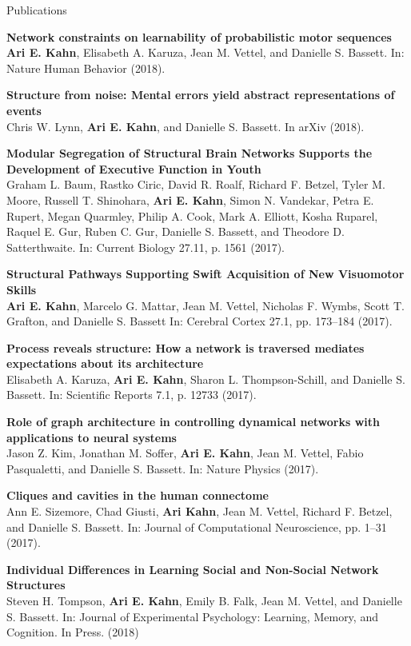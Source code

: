 \documentclass{resume} %
\begin{document}
\begin{rSection}{Publications}


\textbf{Network constraints on learnability of probabilistic motor sequences} \\
\textbf{Ari E. Kahn}, Elisabeth A. Karuza, Jean M. Vettel, and Danielle S. Bassett. In: Nature Human Behavior (2018).

\textbf{Structure from noise: Mental errors yield abstract representations of events} \\
Chris W. Lynn, \textbf{Ari E. Kahn}, and Danielle S. Bassett. In arXiv (2018).


\textbf{Modular Segregation of Structural Brain Networks Supports the Development of Executive Function in Youth} \\
Graham L. Baum, Rastko Ciric, David R. Roalf, Richard F. Betzel, Tyler M. Moore, Russell T. Shinohara, \textbf{Ari E. Kahn}, Simon N. Vandekar, Petra E. Rupert, Megan Quarmley, Philip A. Cook, Mark A. Elliott, Kosha Ruparel, Raquel E. Gur, Ruben C. Gur, Danielle S. Bassett, and Theodore D. Satterthwaite. In: Current Biology 27.11, p. 1561 (2017).

\textbf{Structural Pathways Supporting Swift Acquisition of New Visuomotor Skills} \\
\textbf{Ari E. Kahn}, Marcelo G. Mattar, Jean M. Vettel, Nicholas F. Wymbs, Scott T. Grafton, and Danielle S. Bassett In: Cerebral Cortex 27.1, pp. 173–184 (2017).

\textbf{Process reveals structure: How a network is traversed mediates expectations about its architecture} \\
Elisabeth A. Karuza, \textbf{Ari E. Kahn}, Sharon L. Thompson-Schill, and Danielle S. Bassett. In: Scientific Reports 7.1, p. 12733 (2017).

\textbf{Role of graph architecture in controlling dynamical networks with applications to neural systems} \\
Jason Z. Kim, Jonathan M. Soffer, \textbf{Ari E. Kahn}, Jean M. Vettel, Fabio Pasqualetti, and Danielle S. Bassett. In: Nature Physics (2017).

\textbf{Cliques and cavities in the human connectome} \\
Ann E. Sizemore, Chad Giusti, \textbf{Ari Kahn}, Jean M. Vettel, Richard F. Betzel, and Danielle S. Bassett. In: Journal of Computational Neuroscience, pp. 1–31 (2017).

\textbf{Individual Differences in Learning Social and Non-Social Network Structures} \\
Steven H. Tompson, \textbf{Ari E. Kahn}, Emily B. Falk, Jean M. Vettel, and Danielle S. Bassett. In: Journal of Experimental Psychology: Learning, Memory, and Cognition. In Press. (2018)


\end{rSection}
\end{document}

